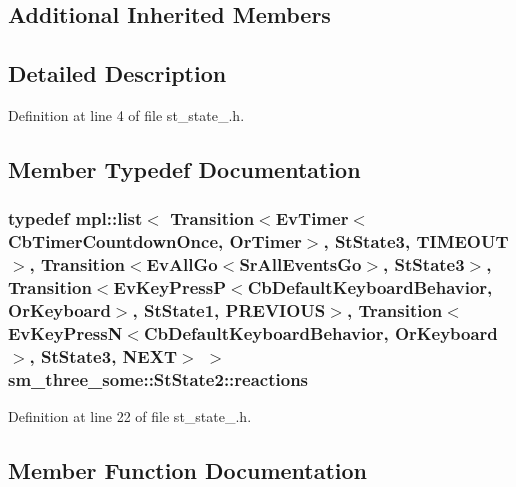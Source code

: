 \subsection*{Additional Inherited Members}


\subsection{Detailed Description}


Definition at line 4 of file st\+\_\+state\+\_.\+h.



\subsection{Member Typedef Documentation}
\subsubsection[{\texorpdfstring{reactions}{reactions}}]{\setlength{\rightskip}{0pt plus 5cm}typedef mpl\+::list$<$ Transition$<$Ev\+Timer$<$Cb\+Timer\+Countdown\+Once, {\bf Or\+Timer}$>$, {\bf St\+State3}, {\bf T\+I\+M\+E\+O\+UT}$>$, Transition$<$Ev\+All\+Go$<$Sr\+All\+Events\+Go$>$, {\bf St\+State3}$>$, Transition$<$Ev\+Key\+PressP$<$Cb\+Default\+Keyboard\+Behavior, {\bf Or\+Keyboard}$>$, {\bf St\+State1}, {\bf P\+R\+E\+V\+I\+O\+US}$>$, Transition$<$Ev\+Key\+PressN$<$Cb\+Default\+Keyboard\+Behavior, {\bf Or\+Keyboard}$>$, {\bf St\+State3}, {\bf N\+E\+XT}$>$ $>$ {\bf sm\+\_\+three\+\_\+some\+::\+St\+State2\+::reactions}}\hypertarget{structsm__three__some_1_1StState2_a882f17a676c2edc41d5e3a76c5255c87}{}\label{structsm__three__some_1_1StState2_a882f17a676c2edc41d5e3a76c5255c87}


Definition at line 22 of file st\+\_\+state\+\_.\+h.



\subsection{Member Function Documentation}
